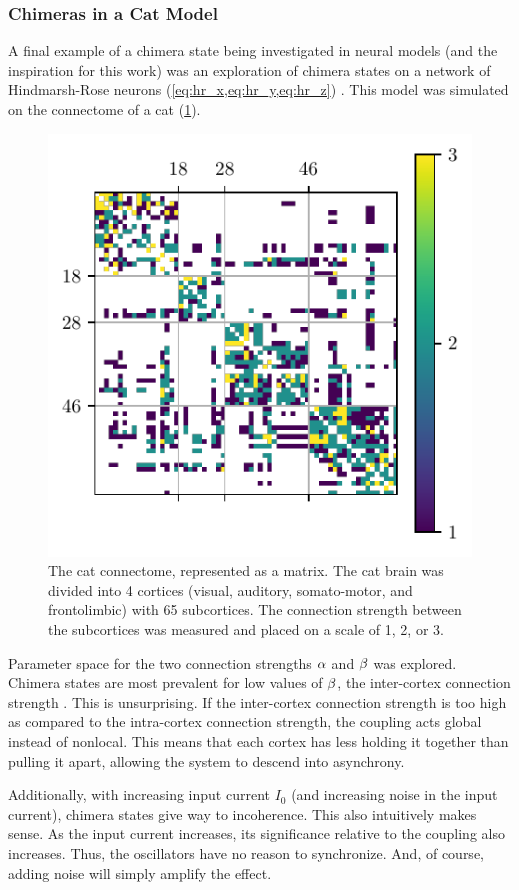 \subsubsection{Chimeras in a Cat Model}
\label{sec:lit_review_chimera_cat}
A final example of a chimera state being investigated in neural models (and the inspiration for this work) was an exploration of chimera states on a network of Hindmarsh-Rose neurons (\cref{eq:hr_x,eq:hr_y,eq:hr_z}) \cite{Santos2017}.
This model was simulated on the connectome of a cat (\cref{fig:cat_matrix}).
\begin{figure}[ht]
  \centering
  \includegraphics[width=0.9\columnwidth]{figure/cat_matrix}
  \caption[Cat connectome]{The cat connectome, represented as a matrix.
    The cat brain was divided into 4 cortices (visual, auditory, somato-motor, and frontolimbic) with 65 subcortices.
    The connection strength between the subcortices was measured and placed on a scale of 1, 2, or 3.
  }
  \label{fig:cat_matrix}
\end{figure}
Parameter space for the two connection strengths $\alpha$ and $\beta$ was explored.
Chimera states are most prevalent for low values of $\beta$, the inter-cortex connection strength \cite{Santos2017}.
This is unsurprising.
If the inter-cortex connection strength is too high as compared to the intra-cortex connection strength, the coupling acts global instead of nonlocal.
This means that each cortex has less holding it together than pulling it apart, allowing the system to descend into asynchrony.

Additionally, with increasing input current $I_{0}$ (and increasing noise in the input current), chimera states give way to incoherence.
This also intuitively makes sense.
As the input current increases, its significance relative to the coupling also increases.
Thus, the oscillators have no reason to synchronize.
And, of course, adding noise will simply amplify the effect.
